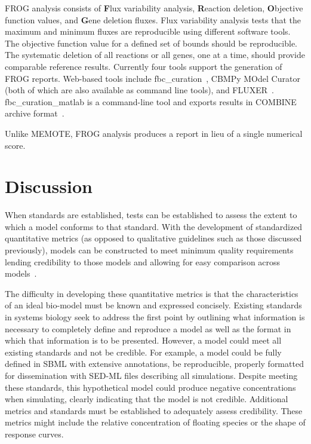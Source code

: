 \documentclass[12pt]{report}
\begin{document}
FROG analysis consists of  \textbf{F}lux variability analysis, \textbf{R}eaction deletion, \textbf{O}bjective function values, and \textbf{G}ene deletion fluxes. Flux variability analysis tests that the maximum and minimum fluxes are reproducible using different software tools. The objective function value for a defined set of bounds should be reproducible. The systematic deletion of all reactions or all genes, one at a time, should provide comparable reference results. Currently four tools support the generation of FROG reports. Web-based tools include fbc\_curation~\cite{sbmlsim21}, CBMPy MOdel Curator~\cite{SBMpy} (both of which are also available as command line tools), and FLUXER~\cite{hari2020}. fbc\_curation\_matlab is a command-line tool and exports results in COMBINE archive format~\cite{fbc_curation}.

Unlike MEMOTE, FROG analysis produces a report in lieu of a single numerical score. 

\section{Discussion}
When standards are established, tests can be established to assess the extent to which a model conforms to that standard. With the development of standardized quantitative metrics (as opposed to qualitative guidelines such as those discussed previously), models can be constructed to meet minimum quality requirements lending credibility to those models and allowing for easy comparison across models~\cite{Kaddi2007-js}. 

The difficulty in developing these quantitative metrics is that the characteristics of an ideal bio-model must be known and expressed concisely. Existing standards in systems biology seek to address the first point by outlining what information is necessary to completely define and reproduce a model as well as the format in which that information is to be presented. However, a model could meet all existing standards and not be credible. For example, a model could be fully defined in SBML with extensive annotations, be reproducible, properly formatted for dissemination with SED-ML files describing all simulations. Despite meeting these standards, this hypothetical model could produce negative concentrations when simulating, clearly indicating that the model is not credible.  Additional metrics and standards must be established to adequately assess credibility. These metrics might include the relative concentration of floating species or the shape of response curves.
\end{document}
